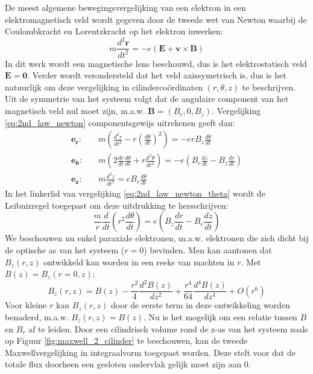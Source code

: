 \documentclass[we,twoside,openright,a4paper,11pt]{uantwerpenbamathesis}
\begin{document}
De meest algemene bewegingsvergelijking van een elektron in een elektromagnetisch veld wordt gegeven door de tweede wet van Newton waarbij de Coulombkracht en Lorentzkracht op het elektron inwerken:
\begin{equation}\label{eq:2nd_law_newton}
    m\frac{d^2\mathbf{r}}{dt^2}=-e(\mathbf{E}+\mathbf{v}\times\mathbf{B})
\end{equation}
In dit werk wordt een magnetische lens beschouwd, dus is het elektrostatisch veld $\mathbf{E}=\mathbf{0}$. Verder wordt verondersteld dat het veld axissymetrisch is, dus is het natuurlijk om deze vergelijking in cilindercoördinaten $(r, \theta, z)$ te beschrijven. Uit de symmetrie van het systeem volgt dat de angulaire component van het magnetisch veld nul moet zijn, m.a.w. $\mathbf{B}=(B_r, 0, B_z)$. Vergelijking \ref{eq:2nd_law_newton} componentsgewijs uitrekenen geeft dan:
\begin{align}
    \mathbf{e_r}: \quad & m\left(\frac{d^2r}{dt^2}-r\left(\frac{d\theta}{dt}\right)^2\right) = -erB_z\frac{d\theta}{dt} \label{eq:2nd_law_newton_r} \\[6pt]
    \mathbf{e_\theta}: \quad & m\left(2\frac{dr}{dt}\frac{d\theta}{dt}+r\frac{d^2\theta}{dt^2}\right) = -e\left(B_r\frac{dz}{dt}-B_z\frac{dr}{dt}\right) \label{eq:2nd_law_newton_theta} \\[6pt]
    \mathbf{e_z}: \quad & m\frac{d^2z}{dt^2} = eB_r\frac{d\theta}{dt} \label{eq:2nd_law_newton_z}
\end{align}
In het linkerlid van vergelijking \ref{eq:2nd_law_newton_theta} wordt de Leibnizregel toegepast om deze uitdrukking te hersschrijven:
\begin{equation}\label{eq:theta_tussenstap}
    \frac{m}{r}\frac{d}{dt}\left(r^2\frac{d\theta}{dt}\right)=e\left(B_z\frac{dr}{dt}-B_r\frac{dz}{dt}\right)
\end{equation}
We beschouwen nu enkel paraxiale elektronen, m.a.w. elektronen die zich dicht bij de optische as van het systeem ($r=0$) bevinden. Men kan aantonen dat $B_z(r, z)$ ontwikkeld kan worden in een reeks van machten in $r$. Met $B(z)=B_z(r=0, z)$:
\begin{equation}\label{eq:b_z_expansion}
    B_z(r, z)=B(z)-\frac{r^2}{4}\frac{d^2B(z)}{dz^2}+\frac{r^4}{64}\frac{d^4B(z)}{dz^4}+O(r^6)
\end{equation}
Voor kleine $r$ kan $B_z(r, z)$ door de eerste term in deze ontwikkeling worden benaderd, m.a.w. $B_z(r, z)=B(z)$. Nu is het mogelijk om een relatie tussen $B$ en $B_r$ af te leiden. Door een cilindrisch volume rond de z-as van het systeem zoals op Figuur \ref{fig:maxwell_2_cilinder} te beschouwen, kan de tweede Maxwellvergelijking in integraalvorm toegepast worden. Deze stelt voor dat de totale flux doorheen een gesloten ondervlak gelijk moet zijn aan $0$.
\end{document}

